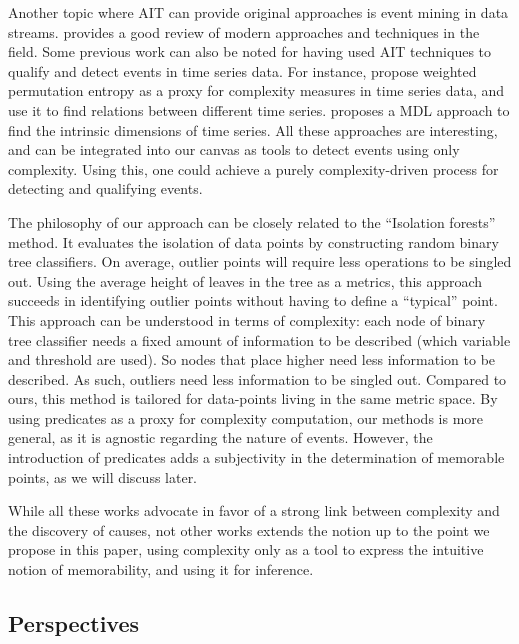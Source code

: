 \documentclass[entropy,article,submit,moreauthors,pdftex]{Definitions/mdpi}
\begin{document}
Another topic where AIT can provide original approaches is event mining in data streams.
\cite{aggarwal_outlier_2017} provides a good review of modern approaches and techniques
in the field. Some previous work can also be noted for having used AIT techniques to qualify and detect events in time series data. For instance, \cite{batista_complexity-invariant_2011,fadlallah_weighted-permutation_2013} propose weighted permutation entropy as a proxy for complexity measures in time series data, and use it to find relations between different time series. \cite{hu_discovering_2011} proposes a MDL approach to find the intrinsic dimensions of time series. All these approaches are interesting, and can be integrated into our canvas as tools to detect events using only complexity. Using this, one could achieve a purely complexity-driven process for detecting and qualifying events.

The philosophy of our approach can be closely related to the ``Isolation forests'' method\cite{liu_isolation_2008,hariri_extended_2021}. It evaluates the isolation of data points by constructing random binary tree classifiers. On average, outlier points will require less operations to be singled out. Using the average height of leaves in the tree as a metrics, this approach succeeds in identifying outlier points without having to define a ``typical'' point. This approach can be understood in terms of complexity: each node of binary tree classifier needs a fixed amount of information to be described (which variable and threshold are used). So nodes that place higher need less information to be described. As such, outliers need less information to be singled out. Compared to ours, this method is tailored for data-points living in the same metric space. By using predicates as a proxy for complexity computation, our methods is more general, as it is agnostic regarding the nature of events. However, the introduction of predicates adds a subjectivity in the determination of memorable points, as we will discuss later.

While all these works advocate in favor of a strong link between complexity and the
discovery of causes, not other works extends the notion up to the point we propose in this paper, using complexity only as a tool to express the intuitive notion of memorability, and using it for inference.

\subsection{Perspectives}
\label{sec:future}
\end{document}
